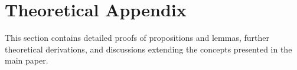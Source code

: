 \documentclass{article}
\numberwithin{figure}{section}
\begin{document}







\appendix

\section{Theoretical Appendix}
% 
\label{app:theory_appendix}
This section contains detailed proofs of propositions and lemmas, further theoretical derivations, and discussions extending the concepts presented in the main paper. 
\end{document}
